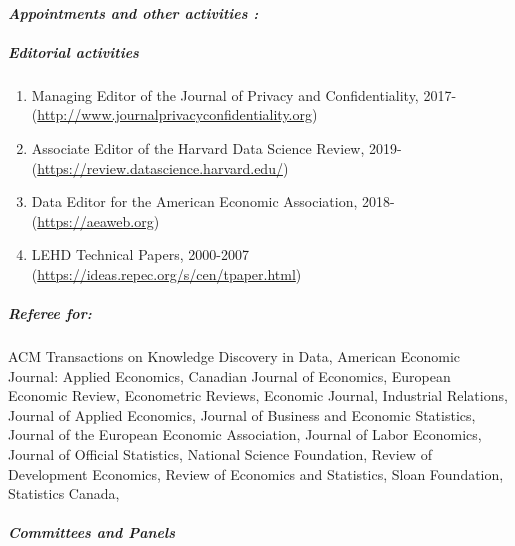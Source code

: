\documentclass[10pt,letterpaper]{report}
\begin{document}
\paragraph{\it \bf Appointments and other activities :}%
\subparagraph{Editorial activities}
\begin{enumerate}
	\item Managing Editor of the Journal of Privacy and Confidentiality, 2017-\newline (\url{http://www.journalprivacyconfidentiality.org})
	\item Associate Editor of the Harvard Data Science Review, 2019-\newline (\url{https://review.datascience.harvard.edu/})
	\item Data Editor for the American Economic Association, 2018- \newline (\url{https://aeaweb.org})
	\item LEHD Technical Papers, 2000-2007 \newline (\url{https://ideas.repec.org/s/cen/tpaper.html})
\end{enumerate}
\subparagraph{ Referee for:}
  ACM   Transactions on Knowledge Discovery in Data, 
  American Economic Journal: Applied Economics,
  Canadian Journal of Economics, 
  European Economic Review,  
  Econometric Reviews, 
  Economic Journal,  
  Industrial Relations, 
  Journal of Applied Economics, 
  Journal of Business and Economic Statistics,  
  Journal of the European Economic Association,
  Journal of Labor   Economics, 
  Journal of Official Statistics,
  National Science Foundation,
  Review of Development Economics, 
  Review of Economics and Statistics,
  Sloan Foundation,
  Statistics Canada,
\subparagraph{Committees and Panels} 
\end{document}
